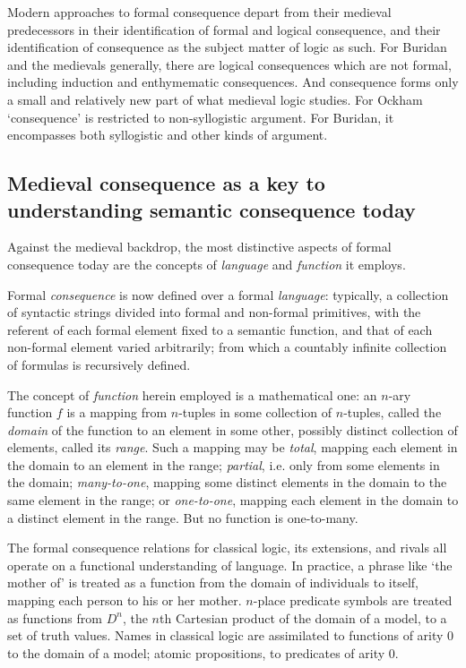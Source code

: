 Modern approaches to formal consequence depart from their medieval predecessors in their identification of formal and logical consequence, and their identification of consequence as the subject matter of logic as such. For Buridan and the medievals generally, there are logical consequences which are not formal, including induction and enthymematic consequences. And consequence forms only a small and relatively new part of what medieval logic studies. For Ockham `consequence' is restricted to non-syllogistic argument. For Buridan, it encompasses both syllogistic and other kinds of argument.

\subsection{Medieval consequence as a key to understanding semantic consequence today}

Against the medieval backdrop, the most distinctive aspects of formal consequence today are the concepts of \textit{language} and \textit{function} it employs.

Formal \textit{consequence} is now defined over a formal \textit{language}: typically, a collection of syntactic strings divided into formal and non-formal primitives, with the referent of each formal element fixed to a semantic function, and that of each non-formal element varied arbitrarily; from which a countably infinite collection of formulas is recursively defined. 

The concept of \textit{function} herein employed is a mathematical one: an $n$-ary function $f$ is a mapping from $n$-tuples in some collection of $n$-tuples, called the \textit{domain} of the function to an element in some other, possibly distinct collection of elements, called its \textit{range}. Such a mapping may be \textit{total}, mapping each element in the domain to an element in the range; \textit{partial}, i.e. only from some elements in the domain; \textit{many-to-one}, mapping some distinct elements in the domain to the same element in the range; or \textit{one-to-one}, mapping each element in the domain to a distinct element in the range. But no function is one-to-many. 

The formal consequence relations for classical logic, its extensions, and rivals all operate on a functional understanding of language. In practice, a phrase like `the mother of' is treated as a function from the domain of individuals to itself, mapping each person to his or her mother. $n$-place predicate symbols are treated as functions from $D^{n}$, the $n$th Cartesian product of the domain of a model, to a set of truth values. Names in classical logic are assimilated to functions of arity 0 to the domain of a model; atomic propositions, to predicates of arity 0.

